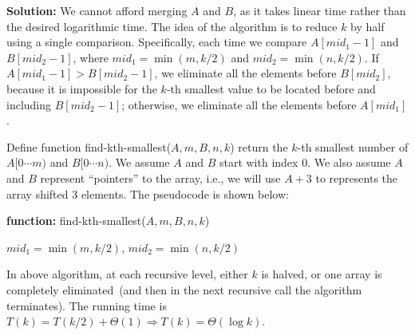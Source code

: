 \documentclass[11pt]{article}
\begin{document}
\begin{qunlist}
{\bf Solution:} We cannot afford merging $A$ and $B$, as it takes linear time rather than the desired logarithmic time.
The idea of the algorithm is to reduce $k$ by half using a single comparison.
Specifically, each time we compare $A[mid_1-1]$ and $B[mid_2-1]$, where $mid_1=\min(m,k/2)$
and $mid_2=\min(n,k/2)$. If $A[mid_1-1]>B[mid_2-1]$, we eliminate all the elements
before $B[mid_2]$, because it is impossible for the $k$-th smallest value to be
located before and including $B[mid_2-1]$; otherwise, we eliminate all the elements before
$A[mid_1]$.

Define function find-kth-smallest($A, m, B, n, k$) return the $k$-th smallest
number of $A[0\cdots m)$ and $B[0\cdots n)$.
We assume $A$ and $B$ start with index 0. We also assume $A$ and $B$ represent ``pointers'' to the array,
i.e., we will use $A + 3$ to represents the array shifted 3 elements.
The pseudocode is shown below:

\begin{algorithm}[H]
{\bf function: } find-kth-smallest($A, m, B, n,k$) \\

$mid_1=\min(m,k/2)$, $mid_2=\min(n,k/2)$\;
\end{algorithm}



In above algorithm, at each recursive level, either $k$ is halved, or one array is
completely eliminated~(and then in the next recursive call the algorithm
terminates).  The running time is $T(k)=T(k/2)+\Theta(1) \Rightarrow
T(k)=\Theta(\log k)$. 

\end{qunlist}
\end{document}
